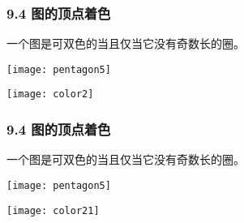 \documentclass{beamer}
\begin{document}
\begin{CJK}{UTF8}{gbsn}
\begin{frame}
\begin{minipage}{0.45\linewidth}
  \end{minipage}
\end{frame}

\begin{frame}
  \frametitle{9.4 图的顶点着色}
  \begin{Thm2}
    一个图是可双色的当且仅当它没有奇数长的圈。
  \end{Thm2}
\vspace{1cm}
  \begin{minipage}{0.45\linewidth}
\texttt{[image: pentagon5]}    
  \end{minipage}
  \begin{minipage}{0.45\linewidth}
    \texttt{[image: color2]}
  \end{minipage}
\end{frame}
\begin{frame}
  \frametitle{9.4 图的顶点着色}
  \begin{Thm2}
    一个图是可双色的当且仅当它没有奇数长的圈。
  \end{Thm2}
\vspace{1cm}
  \begin{minipage}{0.45\linewidth}
\texttt{[image: pentagon5]}    
  \end{minipage}
  \begin{minipage}{0.45\linewidth}
    \texttt{[image: color21]}
  \end{minipage}
\end{frame}


\end{CJK}
\end{document}
